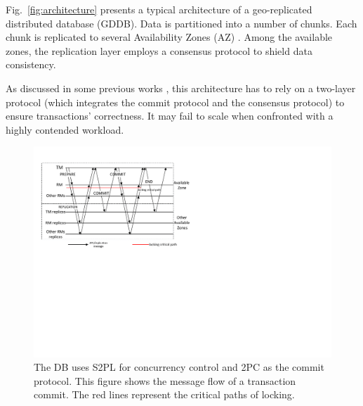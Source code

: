 \documentclass[conference]{IEEEtran}
\begin{document}
Fig.~\ref{fig:architecture} presents a typical architecture of a geo-replicated distributed database (GDDB).
Data is partitioned into a number of chunks.
Each chunk is replicated to several Availability Zones (AZ) \cite{Aurora:conf/sigmod/VerbitskiGSCGBM18}.
Among the available zones, the replication layer employs a consensus protocol to shield data consistency.

As discussed in some previous works \cite{Calvin:conf/sigmod/ThomsonDWRSA12}\cite{Tapir:conf/sosp/ZhangSSKP15}\cite{Janus:conf/osdi/MuNLL16},
this architecture has to rely on a two-layer protocol (which integrates the commit protocol and the consensus protocol) to ensure transactions' correctness.
It may fail to scale when confronted with a highly contended workload.


\begin{figure}[tbp]
  \centerline{\includegraphics[scale=0.50]{figure/message_flow.pdf}}
  \caption
  {
The DB uses S2PL for concurrency control and 2PC as the commit protocol.
This figure shows the message flow of a transaction commit.
The red lines represent the critical paths of locking.
    }
\label{fig:message_flow}
\end{figure}
\end{document}
